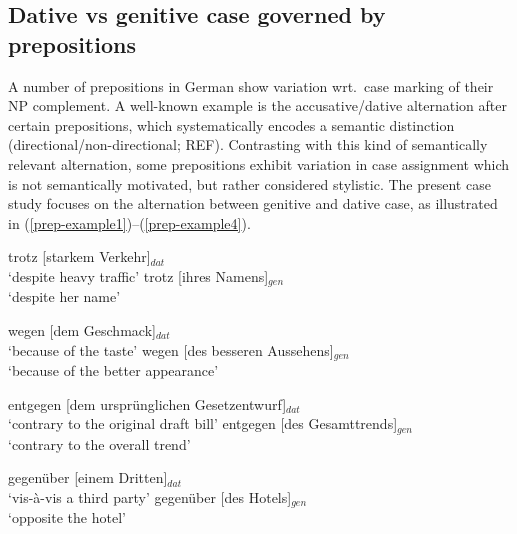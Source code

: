 
\subsection{Dative vs genitive case governed by prepositions}

A number of prepositions in German show variation wrt.\ case marking of their NP complement. A well-known example is the accusative/dative alternation after certain prepositions, which systematically encodes a semantic distinction (directional/non-directional; REF). Contrasting with this kind of semantically relevant alternation, some prepositions exhibit variation in case assignment which is not semantically motivated, but rather considered stylistic. The present case study focuses on the alternation between genitive and dative case, as illustrated in (\ref{prep-example1})--(\ref{prep-example4}).

\begin{exe}
  \ex \label{prep-example1}
    \begin{xlist}
      \ex trotz [starkem Verkehr]$_{dat}$\\
          `despite heavy traffic'
      \ex trotz [ihres Namens]$_{gen}$\\ 
          `despite her name'
    \end{xlist}
  \ex
  \begin{xlist}
    \ex wegen [dem Geschmack]$_{dat}$\\
        `because of the taste'
    \ex wegen [des besseren Aussehens]$_{gen}$\\ 
        `because of the better appearance' 
  \end{xlist}
  \ex
    \begin{xlist}
      \ex entgegen [dem urspr\"unglichen Gesetzentwurf]$_{dat}$\\
          `contrary to the original draft bill' 
      \ex entgegen [des Gesamttrends]$_{gen}$\\ 
          `contrary to the overall trend'
  \end{xlist}
  \ex \label{prep-example4}
    \begin{xlist}
        \ex gegen\"uber [einem Dritten]$_{dat}$\\
            `vis-à-vis a third party'
        \ex gegen\"uber [des Hotels]$_{gen}$\\ 
            `opposite the hotel' 
    \end{xlist}  
\end{exe}


